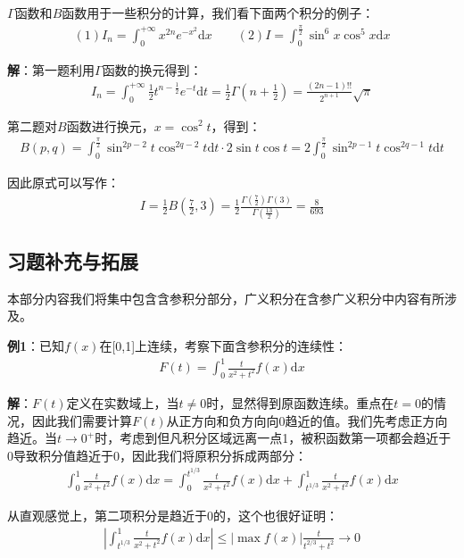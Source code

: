 \documentclass{ctexart}
\let\oldtextbf\textbf
\renewcommand{\textbf}[1]{\textcolor{brown!50!red}{\oldtextbf{#1}}}
\begin{document}
$\Gamma$函数和$B$函数用于一些积分的计算，我们看下面两个积分的例子：
\begin{align*}
   (1) I_n=\int_0^{+\infty}x^{2n}e^{-x^2}\mathrm{d}x\qquad
    (2)I=\int_0^{\frac{\pi}{2}}\sin^6 x\cos^5 x\mathrm{d}x
\end{align*}

\textbf{\color{brown!50!red}解}：第一题利用$\Gamma$函数的换元得到：
\begin{align*}
    I_n=\int_0^{+\infty}\frac{1}{2}t^{n-\frac{1}{2}}e^{-t}\mathrm{d}t=\frac{1}{2}\Gamma(n+\frac{1}{2})=\frac{(2n-1)!!}{2^{n+1}}\sqrt{\pi}
\end{align*}

第二题对$B$函数进行换元，$x=\cos^2t$，得到：
\begin{align*}
    B(p,q)=\int_0^{\frac{\pi}{2}}\sin^{2p-2}t\cos^{2q-2}t\mathrm{d}t\cdot 2\sin t\cos t=2\int_0^{\frac{\pi}{2}}\sin^{2p-1}t\cos^{2q-1}t\mathrm{d}t
\end{align*}

因此原式可以写作：
\begin{align*}
    I=\frac{1}{2}B(\frac{7}{2},3)=\frac{1}{2}\frac{\Gamma(\frac{7}{2})\Gamma(3)}{\Gamma(\frac{13}{2})}=\frac{8}{693}
\end{align*}

\subsection{习题补充与拓展 }
本部分内容我们将集中包含含参积分部分，广义积分在含参广义积分中内容有所涉及。

\textbf{\color{brown!50!red}例1}：已知$f(x)$在[0,1]上连续，考察下面含参积分的连续性：
\begin{align*}
    F(t)=\int_0^1\frac{t}{x^2+t^2}f(x)\mathrm{d}x
\end{align*}

\textbf{\color{brown!50!red}解}：$F(t)$定义在实数域上，当$t\neq 0$时，显然得到原函数连续。重点在$t=0$的情况，因此我们需要计算$F(t)$从正方向和负方向向0趋近的值。我们先考虑正方向趋近。当$t\to 0^+$时，考虑到但凡积分区域远离一点1，被积函数第一项都会趋近于0导致积分值趋近于0，因此我们将原积分拆成两部分：
\begin{align*}
\int_0^1\frac{t}{x^2+t^2}f(x)\mathrm{d}x=\int_0^{t^{1/3}}\frac{t}{x^2+t^2}f(x)\mathrm{d}x
+\int_{t^{1/3}}^1\frac{t}{x^2+t^2}f(x)\mathrm{d}x
\end{align*}

从直观感觉上，第二项积分是趋近于0的，这个也很好证明：
\begin{align*}
\left|\int_{t^{1/3}}^1\frac{t}{x^2+t^2}f(x)\mathrm{d}x\right|\leq |\max f(x)|\frac{t}{t^{2/3}+t^2}\to 0 
\end{align*}
\end{document}
